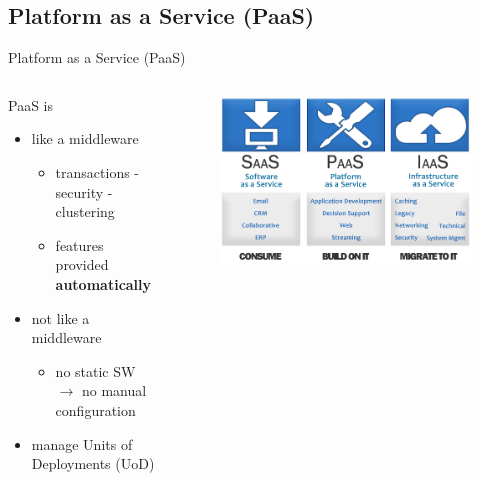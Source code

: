 \subsection{Platform as a Service (PaaS)}
\begin{frame}{Platform as a Service (PaaS)}
	\only<1>
	{
		\begin{columns}
			\begin{column}{0.55\textwidth}
				PaaS is
				\begin{itemize}
					\item{\footnotesize{like a middleware}}
					\begin{itemize}
						\item{\scriptsize{transactions - security - clustering}}
						\item{\scriptsize{features provided \textbf{automatically}}}
					\end{itemize}
					\item{\footnotesize{not like a middleware}}
					\begin{itemize}
						\item{\scriptsize{no static SW $\rightarrow{}$ no manual configuration}}
					\end{itemize}
					\item{\footnotesize{manage Units of Deployments (UoD)}}
				\end{itemize}
			\end{column}
			\begin{column}{0.45\textwidth}
				\begin{figure}
					\centering{}
					\includegraphics[scale=0.22]{images/paas.png}
				\end{figure}
				\begin{flushright}

\end{flushright}
\end{column}
\end{columns}}
\end{frame}
